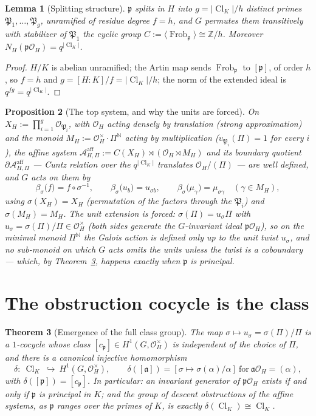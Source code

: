 \documentclass[11pt]{amsart}
\newtheorem{theorem}{Theorem}[section]
\newtheorem{proposition}[theorem]{Proposition}
\newtheorem{lemma}[theorem]{Lemma}
\theoremstyle{remark}
\newcommand{\OH}{\mathcal{O}_H}
\newcommand{\pp}{\mathfrak{p}}
\newcommand{\PP}{\mathfrak{P}}
\newcommand{\Z}{\mathbb{Z}}
\newcommand{\N}{\mathbb{N}}
\newcommand{\Ns}{N}
\newcommand{\Cl}{\operatorname{Cl}}
\newcommand{\Frob}{\operatorname{Frob}}
\newcommand{\Aaff}{\mathcal{A}^{\mathrm{aff}}}
\begin{document}
\begin{lemma}[Splitting structure]\label{lem:split}
$\pp$ splits in $H$ into $g=|\Cl_K|/h$ distinct primes $\PP_1,\dots,\PP_g$, unramified of
residue degree $f=h$, and $G$ permutes them transitively with stabilizer of $\PP_1$ the
cyclic group $C:=\langle\Frob_\pp\rangle\cong\Z/h$. Moreover $\Ns_H(\pp\OH)=q^{|\Cl_K|}$.
\end{lemma}

\begin{proof}
$H/K$ is abelian unramified; the Artin map sends $\Frob_\pp$ to $[\pp]$, of order $h$, so
$f=h$ and $g=[H:K]/f=|\Cl_K|/h$; the norm of the extended ideal is $q^{fg}=q^{|\Cl_K|}$.
\end{proof}

\begin{proposition}[The top system, and why the units are forced]\label{prop:top}
On $X_H:=\prod_{i=1}^g\mathcal O_{\PP_i}$, with $\OH$ acting densely by translation
(strong approximation) and the monoid $M_H:=\OH^\times\cdot\Pi^{\N}$ acting by
multiplication ($v_{\PP_i}(\Pi)=1$ for every $i$), the affine system
$\Aaff_{H,\Pi}:=C(X_H)\rtimes(\OH\rtimes M_H)$ and its boundary quotient
$\partial\Aaff_{H,\Pi}$ --- Cuntz relation over the $q^{|\Cl_K|}$ translates
$\OH/(\Pi)$ --- are well defined, and $G$ acts on them by
\[
\beta_\sigma\bigl(f\bigr)=f\circ\sigma^{-1},\qquad
\beta_\sigma\bigl(u_b\bigr)=u_{\sigma b},\qquad
\beta_\sigma\bigl(\mu_\gamma\bigr)=\mu_{\sigma\gamma}\quad(\gamma\in M_H),
\]
using $\sigma(X_H)=X_H$ (permutation of the factors through the $\PP_i$) and
$\sigma(M_H)=M_H$. The unit extension is forced: $\sigma(\Pi)=u_\sigma\Pi$ with
$u_\sigma=\sigma(\Pi)/\Pi\in\OH^\times$ (both sides generate the $G$-invariant ideal
$\pp\OH$), so on the minimal monoid $\Pi^{\N}$ the Galois action is defined only up to the
unit twist $u_\sigma$, and no sub-monoid on which $G$ acts omits the units unless the
twist is a coboundary --- which, by Theorem~\ref{thm:obstruction}, happens exactly when
$\pp$ is principal.
\end{proposition}

\section{The obstruction cocycle is the class}\label{sec:obstruction}

\begin{theorem}[Emergence of the full class group]\label{thm:obstruction}
The map $\sigma\mapsto u_\sigma=\sigma(\Pi)/\Pi$ is a $1$-cocycle whose class
$[c_\pp]\in H^1(G,\OH^\times)$ is independent of the choice of $\Pi$, and there is a
canonical injective homomorphism
\[
\delta:\ \Cl_K\ \hookrightarrow\ H^1(G,\OH^\times),\qquad
\delta([\mathfrak a])=[\sigma\mapsto\sigma(\alpha)/\alpha]\ \text{for}\
\mathfrak a\OH=(\alpha),
\]
with $\delta([\pp])=[c_\pp]$. In particular: an invariant generator of $\pp\OH$ exists if
and only if $\pp$ is principal in $K$; and the group of descent obstructions of the
affine systems, as $\pp$ ranges over the primes of $K$, is exactly $\delta(\Cl_K)\cong
\Cl_K$.
\end{theorem}
\end{document}
